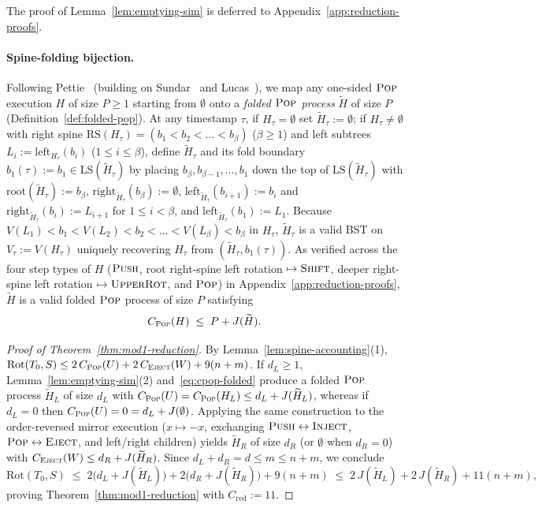 \documentclass[11pt]{article}
\theoremstyle{definition}
\theoremstyle{remark}
\newcommand{\LS}{\mathrm{LS}}
\newcommand{\RS}{\mathrm{RS}}
\newcommand{\Rot}{\mathrm{Rot}}
\newcommand{\PUSH}{\textnormal{\scshape Push}}
\newcommand{\POP}{\textnormal{\scshape Pop}}
\newcommand{\INJECT}{\textnormal{\scshape Inject}}
\newcommand{\EJECT}{\textnormal{\scshape Eject}}
\newcommand{\SHIFT}{\textnormal{\scshape Shift}}
\newcommand{\UPROT}{\textnormal{\scshape UpperRot}}
\begin{document}
The proof of Lemma~\ref{lem:emptying-sim} is deferred to Appendix~\ref{app:reduction-proofs}.

\paragraph{Spine-folding bijection.}
Following Pettie~\cite[Section~2, Observation~2.1 and Figure~2]{Pettie2008} (building on Sundar~\cite[Section~3, Lemma~10]{Sundar1992} and Lucas~\cite{Lucas1990,Lucas1992}), we map any one-sided $\POP$ execution $H$ of size $P \ge 1$ starting from $\emptyset$ onto a \emph{folded $\POP$ process} $\widetilde{H}$ of size $P$ (Definition~\ref{def:folded-pop}). At any timestamp $\tau$, if $H_\tau = \emptyset$ set $\widetilde{H}_\tau := \emptyset$; if $H_\tau \ne \emptyset$ with right spine $\RS(H_\tau) = (b_1 < b_2 < \dots < b_\beta)$ ($\beta \ge 1$) and left subtrees $L_i := \mathrm{left}_{H_\tau}(b_i)$ ($1 \le i \le \beta$), define $\widetilde{H}_\tau$ and its fold boundary $b_1(\tau) := b_1 \in \LS(\widetilde{H}_\tau)$ by placing $b_\beta, b_{\beta - 1}, \dots, b_1$ down the top of $\LS(\widetilde{H}_\tau)$ with $\mathrm{root}(\widetilde{H}_\tau) := b_\beta$, $\mathrm{right}_{\widetilde{H}_\tau}(b_\beta) := \emptyset$, $\mathrm{left}_{\widetilde{H}_\tau}(b_{i+1}) := b_i$ and $\mathrm{right}_{\widetilde{H}_\tau}(b_i) := L_{i+1}$ for $1 \le i < \beta$, and $\mathrm{left}_{\widetilde{H}_\tau}(b_1) := L_1$. Because $V(L_1) < b_1 < V(L_2) < b_2 < \dots < V(L_\beta) < b_\beta$ in $H_\tau$, $\widetilde{H}_\tau$ is a valid BST on $V_\tau := V(H_\tau)$ uniquely recovering $H_\tau$ from $(\widetilde{H}_\tau, b_1(\tau))$. As verified across the four step types of $H$ ($\PUSH$, root right-spine left rotation $\mapsto \SHIFT$, deeper right-spine left rotation $\mapsto \UPROT$, and $\POP$) in Appendix~\ref{app:reduction-proofs}, $\widetilde{H}$ is a valid folded $\POP$ process of size $P$ satisfying
\begin{equation}
\label{eq:cpop-folded}
C_{\POP}(H) \;\le\; P + J(\widetilde{H}).
\end{equation}

\begin{proof}[Proof of Theorem~\ref{thm:mod1-reduction}]
By Lemma~\ref{lem:spine-accounting}(1), $\Rot(T_0, S) \le 2\,C_{\POP}(U) + 2\,C_{\EJECT}(W) + 9(n + m)$. If $d_L \ge 1$, Lemma~\ref{lem:emptying-sim}(2) and~\eqref{eq:cpop-folded} produce a folded $\POP$ process $\widetilde{H}_L$ of size $d_L$ with $C_{\POP}(U) = C_{\POP}(H_L) \le d_L + J(\widetilde{H}_L)$, whereas if $d_L = 0$ then $C_{\POP}(U) = 0 = d_L + J(\emptyset)$. Applying the same construction to the order-reversed mirror execution ($x \mapsto -x$, exchanging $\PUSH \leftrightarrow \INJECT$, $\POP \leftrightarrow \EJECT$, and left/right children) yields $\widetilde{H}_R$ of size $d_R$ (or $\emptyset$ when $d_R = 0$) with $C_{\EJECT}(W) \le d_R + J(\widetilde{H}_R)$. Since $d_L + d_R = d \le m \le n + m$, we conclude
\[
\Rot(T_0, S) \;\le\; 2\big(d_L + J(\widetilde{H}_L)\big) + 2\big(d_R + J(\widetilde{H}_R)\big) + 9(n + m) \;\le\; 2\,J(\widetilde{H}_L) + 2\,J(\widetilde{H}_R) + 11(n + m),
\]
proving Theorem~\ref{thm:mod1-reduction} with $C_{\mathrm{red}} := 11$.
\end{proof}
\end{document}
